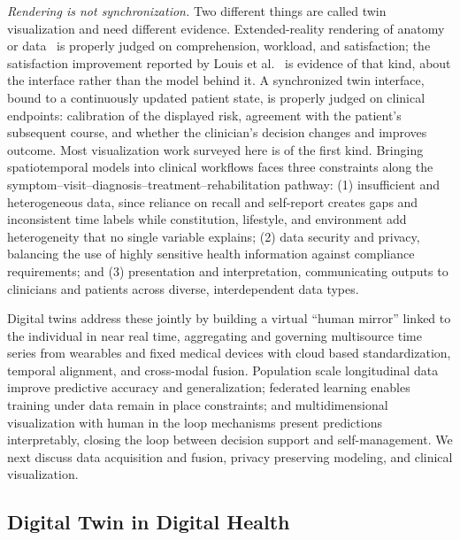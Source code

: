 \documentclass[journal]{IEEEtran}
\begin{document}
\emph{Rendering is not synchronization.} Two different things are called twin visualization and need different evidence. Extended-reality rendering of anatomy or data~\cite{Auvinet2018AR} is properly judged on comprehension, workload, and satisfaction; the satisfaction improvement reported by Louis et al.~\cite{Louis2021VR} is evidence of that kind, about the interface rather than the model behind it. A synchronized twin interface, bound to a continuously updated patient state, is properly judged on clinical endpoints: calibration of the displayed risk, agreement with the patient's subsequent course, and whether the clinician's decision changes and improves outcome. Most visualization work surveyed here is of the first kind.
\else
Bringing spatiotemporal models into clinical workflows faces three constraints along the symptom--visit--diagnosis--treatment--rehabilitation pathway: (1) insufficient and heterogeneous data, since reliance on recall and self-report creates gaps and inconsistent time labels while constitution, lifestyle, and environment add heterogeneity that no single variable explains; (2) data security and privacy, balancing the use of highly sensitive health information against compliance requirements; and (3) presentation and interpretation, communicating outputs to clinicians and patients across diverse, interdependent data types.

Digital twins address these jointly by building a virtual ``human mirror'' linked to the individual in near real time, aggregating and governing multisource time series from wearables and fixed medical devices with cloud based standardization, temporal alignment, and cross-modal fusion. Population scale longitudinal data improve predictive accuracy and generalization; federated learning enables training under data remain in place constraints; and multidimensional visualization with human in the loop mechanisms present predictions interpretably, closing the loop between decision support and self-management. We next discuss data acquisition and fusion, privacy preserving modeling, and clinical visualization.

\subsection{Digital Twin in Digital Health}
\end{document}
